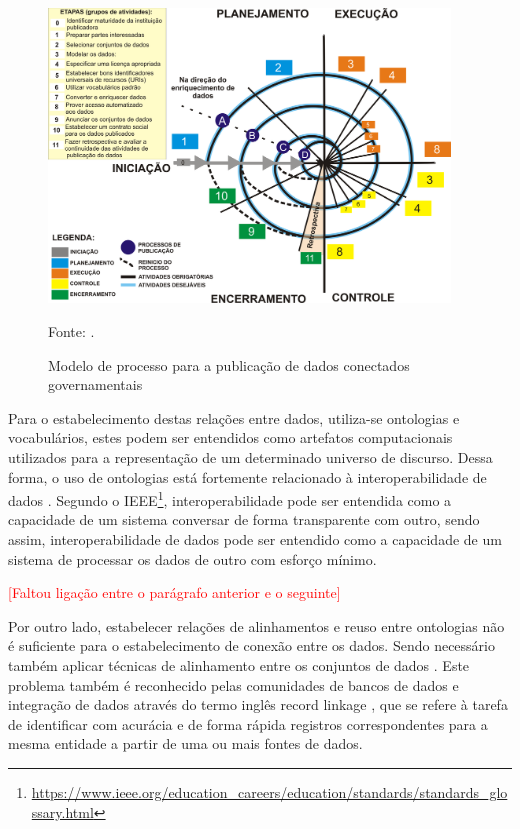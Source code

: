 \begin{figure}[!ht]
	\centering
	\includegraphics[width=0.95\textwidth]{./imagens/modelo-de-processo.png}\\
    \caption{Modelo de processo para a publicação de dados conectados governamentais}
	\footnotesize{Fonte: \cite{Avila2015}.}
	\label{fig:modelo_processo}
\end{figure}

Para o estabelecimento destas relações entre dados, utiliza-se ontologias e vocabulários, estes podem ser entendidos como artefatos computacionais utilizados para a representação de um determinado universo de discurso. Dessa forma, o uso de ontologias está fortemente relacionado à interoperabilidade de dados \cite{guarino1998formal, simon2004using, farinelli2013papel}. Segundo o IEEE\footnote{\url{https://www.ieee.org/education_careers/education/standards/standards_glossary.html}}, interoperabilidade pode ser entendida como a capacidade de um sistema conversar de forma transparente com outro, sendo assim, interoperabilidade de dados pode ser entendido como a capacidade de um sistema de processar os dados de outro com esforço mínimo. 

\textcolor{red}{[Faltou ligação entre o parágrafo anterior e o seguinte]}

Por outro lado, estabelecer relações de alinhamentos e reuso entre ontologias não é suficiente para o estabelecimento de conexão entre os dados. Sendo necessário também aplicar técnicas de alinhamento entre os conjuntos de dados \cite{Castano2008}. Este problema também é reconhecido pelas comunidades de bancos de dados e integração de dados através do termo inglês record linkage \cite{gu2003record}, que se refere à tarefa de identificar com acurácia e de forma rápida registros correspondentes para a mesma entidade a partir de uma ou mais fontes de dados.

